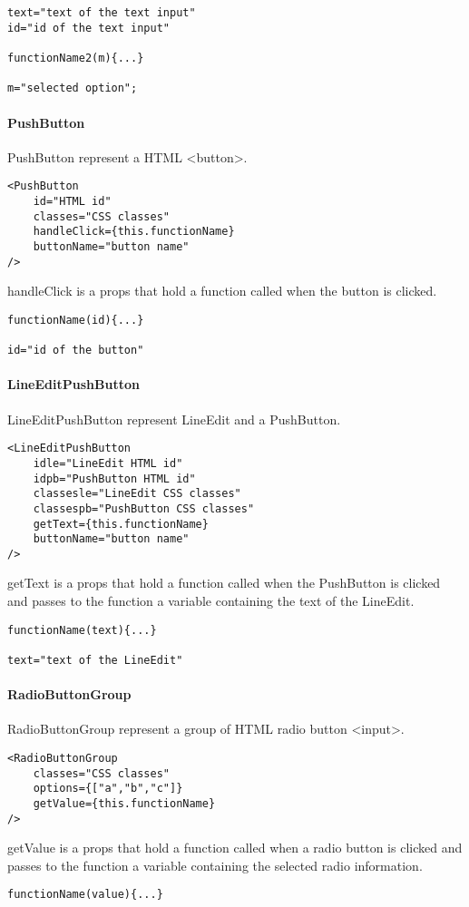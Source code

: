 \begin{flushleft}
\begin{verbatim}
text="text of the text input"
id="id of the text input"

functionName2(m){...}

m="selected option";
\end{verbatim}
    \paragraph{PushButton}
PushButton represent a HTML <button>.
\begin{verbatim}
<PushButton
    id="HTML id"
    classes="CSS classes"
    handleClick={this.functionName}
    buttonName="button name"
/>
\end{verbatim}
handleClick is a props that hold a function called when the button is clicked.
\begin{verbatim}
functionName(id){...}

id="id of the button"
\end{verbatim}

    \paragraph{LineEditPushButton}
LineEditPushButton represent LineEdit and a PushButton.
\begin{verbatim}
<LineEditPushButton
    idle="LineEdit HTML id"
    idpb="PushButton HTML id"
    classesle="LineEdit CSS classes"
    classespb="PushButton CSS classes"
    getText={this.functionName}
    buttonName="button name"
/>
\end{verbatim}
getText is a props that hold a function called when the PushButton is clicked and passes to the function a variable containing the text of the LineEdit.
\begin{verbatim}
functionName(text){...}

text="text of the LineEdit"
\end{verbatim}

    \paragraph{RadioButtonGroup}
RadioButtonGroup represent a group of HTML radio button <input>.
\begin{verbatim}
<RadioButtonGroup
    classes="CSS classes"
    options={["a","b","c"]}
    getValue={this.functionName}
/>
\end{verbatim}
getValue is a props that hold a function called when a radio button is clicked and passes to the function a variable containing the selected radio information.
\begin{verbatim}
functionName(value){...}


\end{verbatim}
\end{flushleft}
